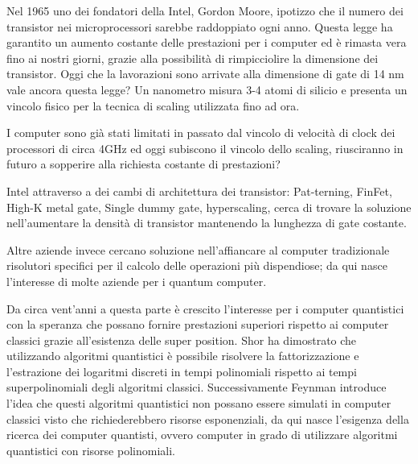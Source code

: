 Nel 1965 uno dei fondatori della Intel, Gordon Moore, ipotizzo che il numero dei transistor nei microprocessori sarebbe raddoppiato ogni anno. Questa legge ha garantito un aumento costante delle prestazioni per i computer ed è rimasta vera fino ai nostri giorni, grazie alla possibilità di rimpicciolire la dimensione dei transistor. Oggi che la lavorazioni sono arrivate alla dimensione di gate di 14 nm vale ancora questa legge? Un nanometro misura 3-4 atomi di silicio e presenta un vincolo fisico per la tecnica di scaling utilizzata fino ad ora.

I computer sono già stati limitati in passato dal vincolo di velocità di clock dei processori di circa 4GHz ed oggi subiscono il vincolo dello scaling, riusciranno in futuro a sopperire alla richiesta costante di prestazioni?

\cite{s24}Intel attraverso a dei cambi di architettura dei transistor: Pat-terning, FinFet, High-K metal gate, Single dummy gate, hyperscaling, cerca di trovare la soluzione nell'aumentare la densità di transistor mantenendo la lunghezza di gate costante.

Altre aziende invece cercano soluzione nell'affiancare al computer tradizionale risolutori specifici per il calcolo delle operazioni più dispendiose; da qui nasce l'interesse di molte aziende per i quantum computer.

\cite{nac}Da circa vent'anni a questa parte è crescito l'interesse per i computer quantistici con la speranza che possano fornire prestazioni superiori rispetto ai computer classici grazie all'esistenza delle super position. Shor ha dimostrato che utilizzando algoritmi quantistici è possibile risolvere la fattorizzazione e l'estrazione dei logaritmi discreti in tempi polinomiali rispetto ai tempi superpolinomiali degli algoritmi classici. Successivamente Feynman introduce l'idea che questi algoritmi quantistici non possano essere simulati in computer classici visto che richiederebbero risorse esponenziali, da qui nasce l'esigenza della ricerca dei computer quantisti, ovvero computer in grado di utilizzare algoritmi quantistici con risorse polinomiali.
